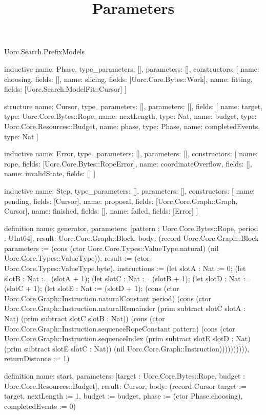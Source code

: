 \begin{lexlean}{Uorc.Search.PrefixModels}
\title{Parameters}
\begin{semanticmodule}
inductive{
  name: Phase,
  type_parameters: [],
  parameters: [],
  constructors: [
    {name: choosing, fields: []},
    {name: slicing, fields: [Uorc.Core.Bytes::Work]},
    {name: fitting, fields: [Uorc.Search.ModelFit::Cursor]}
  ]
}

structure{
  name: Cursor,
  type_parameters: [],
  parameters: [],
  fields: [
    {name: target, type: Uorc.Core.Bytes::Rope},
    {name: nextLength, type: Nat},
    {name: budget, type: Uorc.Core.Resources::Budget},
    {name: phase, type: Phase},
    {name: completedEvents, type: Nat}
  ]
}

inductive{
  name: Error,
  type_parameters: [],
  parameters: [],
  constructors: [
    {name: rope, fields: [Uorc.Core.Bytes::RopeError]},
    {name: coordinateOverflow, fields: []},
    {name: invalidState, fields: []}
  ]
}

inductive{
  name: Step,
  type_parameters: [],
  parameters: [],
  constructors: [
    {name: pending, fields: [Cursor]},
    {name: proposal, fields: [Uorc.Core.Graph::Graph, Cursor]},
    {name: finished, fields: []},
    {name: failed, fields: [Error]}
  ]
}

definition{
  name: generator,
  parameters: [pattern : Uorc.Core.Bytes::Rope, period : UInt64],
  result: Uorc.Core.Graph::Block,
  body: (record Uorc.Core.Graph::Block {parameters := (cons (ctor Uorc.Core.Types::ValueType.natural) (nil Uorc.Core.Types::ValueType)), result := (ctor Uorc.Core.Types::ValueType.byte), instructions := (let slotA : Nat := 0; (let slotB : Nat := (slotA + 1); (let slotC : Nat := (slotB + 1); (let slotD : Nat := (slotC + 1); (let slotE : Nat := (slotD + 1); (cons (ctor Uorc.Core.Graph::Instruction.naturalConstant period) (cons (ctor Uorc.Core.Graph::Instruction.naturalRemainder (prim subtract slotC slotA : Nat) (prim subtract slotC slotB : Nat)) (cons (ctor Uorc.Core.Graph::Instruction.sequenceRopeConstant pattern) (cons (ctor Uorc.Core.Graph::Instruction.sequenceIndex (prim subtract slotE slotD : Nat) (prim subtract slotE slotC : Nat)) (nil Uorc.Core.Graph::Instruction)))))))))), returnDistance := 1})
}

definition{
  name: start,
  parameters: [target : Uorc.Core.Bytes::Rope, budget : Uorc.Core.Resources::Budget],
  result: Cursor,
  body: (record Cursor {target := target, nextLength := 1, budget := budget, phase := (ctor Phase.choosing), completedEvents := 0})
}


\end{semanticmodule}
\end{lexlean}
